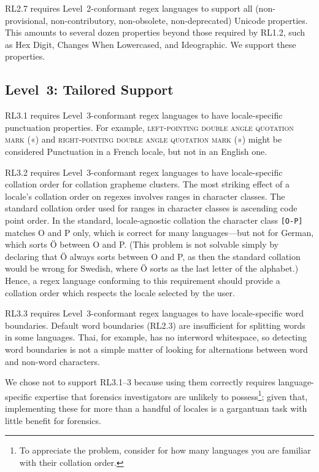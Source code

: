 \documentclass[5p,final,number,sort&compress]{elsarticle}
\newcommand{\re}[1]{\texttt{#1}}
\begin{document}
RL2.7 requires Level~2-conformant regex languages to support all (non-provisional, non-contributory, non-obsolete, non-deprecated) Unicode properties. This amounts to several dozen properties beyond those required by RL1.2, such as Hex Digit, Changes When Lowercased, and Ideographic. We support these properties.

\subsection{Level~3: Tailored Support}

RL3.1 requires Level~3-conformant regex languages to have locale-specific punctuation properties. For example, \textsc{left-pointing double angle quotation mark} («) and \textsc{right-pointing double angle quotation mark} (») might be considered Punctuation in a French locale, but not in an English one.

RL3.2 requires Level~3-conformant regex languages to have locale-specific collation order for collation grapheme clusters. The most striking effect of a locale's collation order on regexes involves ranges in character classes. The standard collation order used for ranges in character classes is ascending code point order. In the standard, locale-agnostic collation the character class \re{[O-P]} matches O and P only, which is correct for many languages---but not for German, which sorts \"O between O and P. (This problem is not solvable simply by declaring that \"O always sorts between O and P, as then the standard collation would be wrong for Swedish, where \"O sorts as the last letter of the alphabet.)  Hence, a regex language conforming to this requirement should provide a collation order which respects the locale selected by the user.

RL3.3 requires Level~3-conformant regex languages to have locale-specific word boundaries. Default word boundaries (RL2.3) are insufficient for splitting words in some languages. Thai, for example, has no interword whitespace, so detecting word boundaries is not a simple matter of looking for alternations between word and non-word characters.

We chose not to support RL3.1--3 because using them correctly requires language-specific expertise that forensics investigators are unlikely to possess\footnote{To appreciate the problem, consider for how many languages you are familiar with their collation order.}; given that, implementing these for more than a handful of locales is a gargantuan task with little benefit for forensics.
\end{document}
